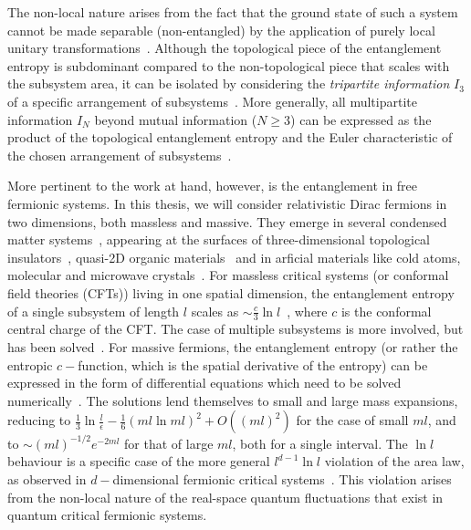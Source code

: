 The non-local nature arises from the fact that the ground state of such a system cannot be made separable (non-entangled) by the application of purely local unitary transformations~\cite{chen2010local,gu2009,zeng2019}. Although the topological piece of the entanglement entropy is subdominant compared to the non-topological piece that scales with the subsystem area, it can be isolated by considering the {\it tripartite information} \(I_3\) of a specific arrangement of subsystems~\cite{kitaev2006topological,Levin_Wen_2006}. More generally, all multipartite information \(I_N\) beyond mutual information (\(N \geq 3\)) can be expressed as the product of the topological entanglement entropy and the Euler characteristic of the chosen arrangement of subsystems~\cite{siddhartha_TEE}.

More pertinent to the work at hand, however, is the entanglement in free fermionic systems.
In this thesis, we will consider relativistic Dirac fermions in two dimensions, both massless and massive. They emerge in several condensed matter systems~\cite{vafek_2014_diracreview}, appearing at the surfaces of three-dimensional topological insulators~\cite{bernevig_2013,cayssol2013,moessner_moore_2021,Rachel_2018}, quasi-2D organic materials~\cite{wang_2015,Wu_2016,ni_2022_dirac} and in arficial materials like cold atoms, molecular and microwave crystals~\cite{zhu_2007_coldatoms,Lepori_2010,Boada_2011,Kuno2018,Gomes2012,Yuan2016,bellec_2013}.
For massless critical systems (or conformal field theories (CFTs)) living in one spatial dimension, the entanglement entropy of a single subsystem of length \(l\) scales as \(\sim \frac{c}{3}\ln l\)~\cite{vidal2003entanglement,latorre_extanglement_2003,lattore_pra_2005,Jin_2004,lambert_2004,holzhey_1994,casini_2004_spinchain,calabrese2004,osborne2002entanglement,osterloh2002scaling}, where \(c\) is the conformal central charge of the CFT.
The case of multiple subsystems is more involved, but has been solved~\cite{Casini_2005,calabrese2004,korepin_2004}.
For massive fermions, the entanglement entropy (or rather the entropic \(c-\)function, which is the spatial derivative of the entropy) can be expressed in the form of differential equations which need to be solved numerically~\cite{Casini_2005,Cardy2008,Casini_2009_multi,doyon_2009}.
The solutions lend themselves to small and large mass expansions, reducing to \(\frac{1}{3}\ln \frac{l}{\epsilon} - \frac{1}{6}\left(ml \ln ml\right)^2 + O((ml)^2)\) for the case of small \(ml\), and to \(\sim (ml)^{-1/2} e^{-2ml}\) for that of large \(ml\),  both for a single interval.
The \(\ln l\) behaviour is a specific case of the more general \(l^{d-1}\ln l\) violation of the area law, as observed in \(d-\)dimensional fermionic critical systems~\cite{Casini_2005,Casini_2009,gioev2006,wolf_area_2006,li_scaling_2006,barthel_2006,farkas_2007,wolf2008area,Castro_Alvaredo_2009,swingle2010,helling_2011,Calabrese_2012,swingle_2012_renyi,Calabrese_2012_fluctuations,tan_ryu_2020,Murciano_2020}. This violation arises from the non-local nature of the real-space quantum fluctuations that exist in quantum critical fermionic systems.

